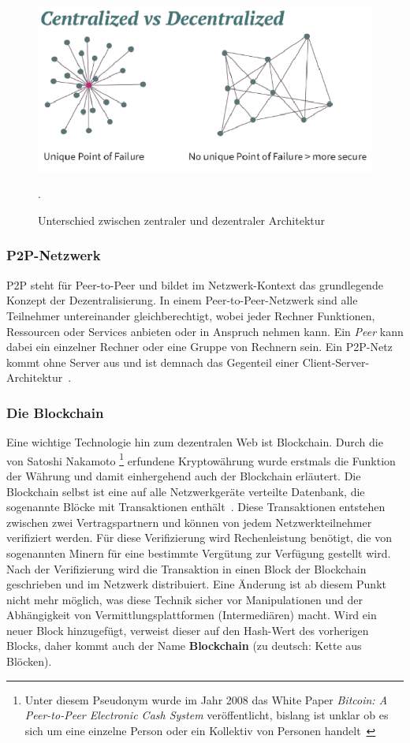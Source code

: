 \begin{figure}
	\centering
	\includegraphics[width=\linewidth]{images/centralized_decentralized}
	\caption{Unterschied zwischen zentraler und dezentraler Architektur~\cite{Blockchainhub.net.2019}}.
	\label{centralized_dezentralized}
\end{figure}


\subsubsection{P2P-Netzwerk}

P2P steht für Peer-to-Peer und bildet im Netzwerk-Kontext das grundlegende Konzept der Dezentralisierung. In einem Peer-to-Peer-Netzwerk sind alle Teilnehmer untereinander gleichberechtigt, wobei jeder Rechner Funktionen, Ressourcen oder Services anbieten oder in Anspruch nehmen kann. Ein \textit{Peer} kann dabei ein einzelner Rechner oder eine Gruppe von Rechnern sein. Ein P2P-Netz kommt ohne Server aus und ist demnach das Gegenteil einer Client-Server-Architektur~\cite{Luber.2018}. 


\subsubsection{Die Blockchain}

Eine wichtige Technologie hin zum dezentralen Web ist Blockchain. Durch die von Satoshi Nakamoto
\footnote{
	Unter diesem Pseudonym wurde im Jahr 2008 das White Paper \textit{Bitcoin: A Peer-to-Peer Electronic Cash System} veröffentlicht, bislang ist unklar ob es sich um eine einzelne Person oder ein Kollektiv von Personen handelt~\cite{BTCAcademy.2018}
}
erfundene Kryptowährung wurde erstmals die Funktion der Währung und damit einhergehend auch der Blockchain erläutert.
Die Blockchain selbst ist eine auf alle Netzwerkgeräte verteilte Datenbank, die sogenannte Blöcke mit Transaktionen enthält~\cite[S. 8]{Crosby.2016}. Diese Transaktionen entstehen zwischen zwei Vertragspartnern und können von jedem Netzwerkteilnehmer verifiziert werden. Für diese Verifizierung wird Rechenleistung benötigt, die von sogenannten Minern für eine bestimmte Vergütung zur Verfügung gestellt wird. Nach der Verifizierung wird die Transaktion in einen Block der Blockchain geschrieben und im Netzwerk distribuiert. Eine Änderung ist ab diesem Punkt nicht mehr möglich, was diese Technik sicher vor Manipulationen und der Abhängigkeit von Vermittlungsplattformen (Intermediären) macht. Wird ein neuer Block hinzugefügt, verweist dieser auf den Hash-Wert des vorherigen Blocks, daher kommt auch der Name \textbf{Blockchain} (zu deutsch: Kette aus Blöcken).


